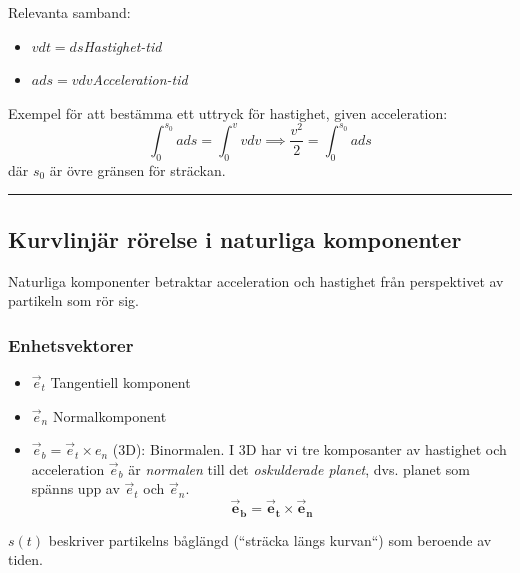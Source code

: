 \documentclass{article}
\newenvironment{ankiflashcard}[1]{}{}
\newcommand{\ruler}{
\rule{0.5\textwidth}{0.5pt}
}
\begin{document}
\begin{paracol}{2}
\begin{ankiflashcard}{Ange Hastighet-tid, Acceleration-tid och Hastighet-position samband.}
Relevanta samband:
\begin{itemize}
    \item $vdt = ds$\quad\textit{Hastighet-tid}
    \item $ads = vdv$\quad\textit{Acceleration-tid}
\end{itemize}
Exempel för att bestämma ett uttryck för hastighet, given acceleration:
$$\int_0^{s_0} a ds = \int_0^v v dv\implies \frac{v^2}{2} = \int_0^{s_0} a ds$$
där $s_0$ är övre gränsen för sträckan.
\end{ankiflashcard}

\ruler
\subsection{Kurvlinjär rörelse i naturliga komponenter}
Naturliga komponenter betraktar acceleration och hastighet från perspektivet av partikeln som rör sig.

\subsubsection{Enhetsvektorer}
\begin{itemize}
    \item $\vec e_t$ Tangentiell komponent
    \item  $\vec e_n$ Normalkomponent
    \item $\vec e_b=\vec e_t \times e_n$ (3D): Binormalen. I 3D har vi tre komposanter av hastighet och acceleration $\vec e_b$ är \textit{normalen} till det \textit{oskulderade planet}, dvs. planet som spänns upp av $\vec e_t$ och $\vec e_n$.
    $$\boxed{\mathbf{\vec e_b = \vec e_t \times \vec e_n}}$$
\end{itemize}
$s(t)$ beskriver partikelns båglängd (``sträcka längs kurvan``) som beroende av tiden.

\begin{ankiflashcard}{Ange ekvationer för läge, hastighet och acceleration i naturliga komponenter.}
    

\end{ankiflashcard}
\end{paracol}
\end{document}
